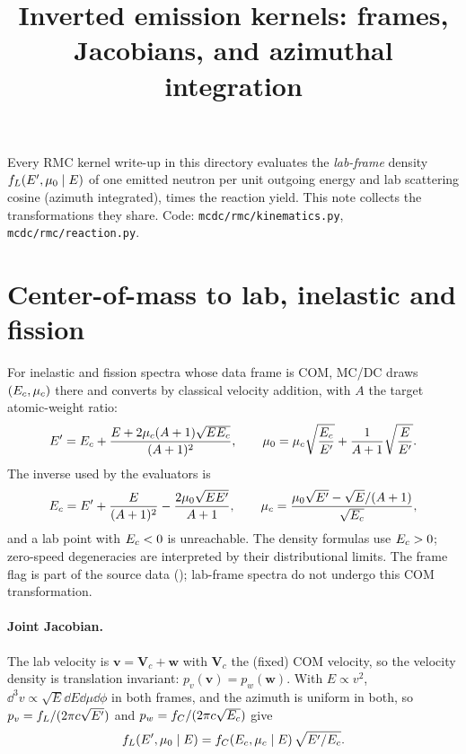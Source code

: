 \documentclass[11pt]{article}
\title{Inverted emission kernels: frames, Jacobians, and azimuthal integration}
\date{}
\begin{document}
\maketitle

\noindent Every RMC kernel write-up in this directory evaluates the \emph{lab-frame}
density $f_L(E', \mu_0 \mid E)$ of one emitted neutron per unit outgoing energy
and lab scattering cosine (azimuth integrated), times the reaction yield. This note
collects the transformations they share. Code: \texttt{mcdc/rmc/kinematics.py},
\texttt{mcdc/rmc/reaction.py}.

\section{Center-of-mass to lab, inelastic and fission}

For inelastic and fission spectra whose data frame is COM, MC/DC draws
$(E_{c},\mu_{c})$ there and converts by classical velocity addition, with $A$ the target
atomic-weight ratio:
\begin{equation}
  E' = E_{c} + \frac{E + 2\mu_{c} (A+1)\sqrt{EE_{c}}}{(A+1)^2},\qquad
  \mu_0 = \mu_{c}\sqrt{\frac{E_{c}}{E'}} + \frac{1}{A+1}\sqrt{\frac{E}{E'}} .
\end{equation}
The inverse used by the evaluators is
\begin{equation}
  E_{c} = E' + \frac{E}{(A+1)^2} - \frac{2\mu_0\sqrt{EE'}}{A+1},\qquad
  \mu_{c} = \frac{\mu_0\sqrt{E'} - \sqrt{E}/(A+1)}{\sqrt{E_{c}}},
\end{equation}
and a lab point with $E_{c}<0$ is unreachable. The density formulas use
$E_{c}>0$; zero-speed degeneracies are interpreted by their distributional limits.
The frame flag is part of the source data ();
lab-frame spectra do not undergo this COM transformation.

\paragraph{Joint Jacobian.} The lab velocity is $\bm v = \bm V_c + \bm w$ with $\bm V_c$
the (fixed) COM velocity, so the velocity density is translation invariant:
$p_v(\bm v) = p_w(\bm w)$. With $E \propto v^2$, $\dd^3 v \propto \sqrt{E}\dd E \dd\mu
\dd\phi$ in both frames, and the azimuth is uniform in both, so
$p_v = f_L / (2\pi c\sqrt{E'})$ and $p_w = f_C / (2\pi c\sqrt{E_{c}})$ give
\begin{equation}
  f_L(E', \mu_0 \mid E) = f_C(E_{c}, \mu_{c} \mid E)\,\sqrt{E'/E_{c}}.
\end{equation}
\end{document}
